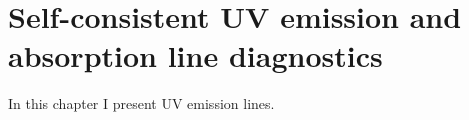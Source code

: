 \chapter{Self-consistent UV emission and absorption line diagnostics}
\label{ch:UV}
%
%
%
%


In this chapter I present UV emission lines.